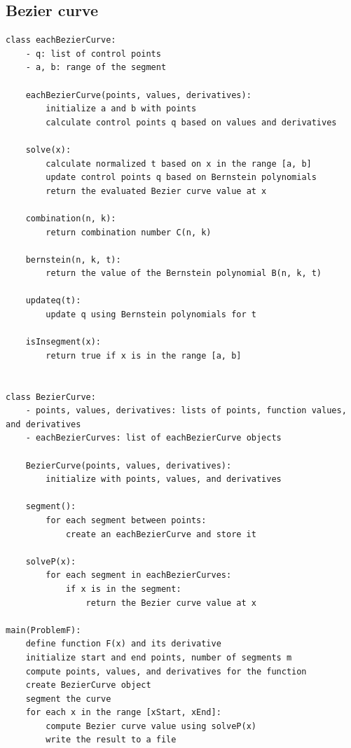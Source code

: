 \documentclass[UTF8]{ctexart}
\begin{document}
\subsection{Bezier curve}
\begin{lstlisting}[basicstyle=\ttfamily]
    class eachBezierCurve:
    - q: list of control points
    - a, b: range of the segment

    eachBezierCurve(points, values, derivatives):
        initialize a and b with points
        calculate control points q based on values and derivatives

    solve(x):
        calculate normalized t based on x in the range [a, b]
        update control points q based on Bernstein polynomials
        return the evaluated Bezier curve value at x

    combination(n, k):
        return combination number C(n, k)

    bernstein(n, k, t):
        return the value of the Bernstein polynomial B(n, k, t)

    updateq(t):
        update q using Bernstein polynomials for t

    isInsegment(x):
        return true if x is in the range [a, b]


class BezierCurve:
    - points, values, derivatives: lists of points, function values, and derivatives
    - eachBezierCurves: list of eachBezierCurve objects

    BezierCurve(points, values, derivatives):
        initialize with points, values, and derivatives

    segment():
        for each segment between points:
            create an eachBezierCurve and store it

    solveP(x):
        for each segment in eachBezierCurves:
            if x is in the segment:
                return the Bezier curve value at x

main(ProblemF):
    define function F(x) and its derivative
    initialize start and end points, number of segments m
    compute points, values, and derivatives for the function
    create BezierCurve object
    segment the curve
    for each x in the range [xStart, xEnd]:
        compute Bezier curve value using solveP(x)
        write the result to a file


\end{lstlisting}
\end{document}
